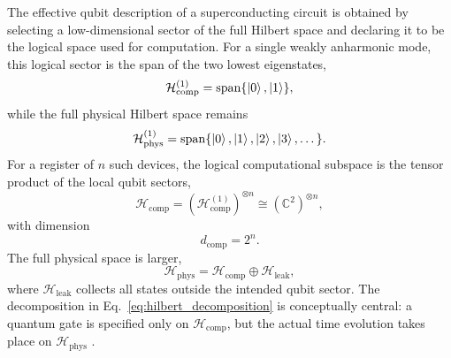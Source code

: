 The effective qubit description of a superconducting circuit is obtained by selecting a low-dimensional sector of the full Hilbert space and declaring it to be the logical space used for computation. For a single weakly anharmonic mode, this logical sector is the span of the two lowest eigenstates,
\begin{equation}
\mathcal{H}_{\mathrm{comp}}^{(1)}
=
\mathrm{span}\{\ket{0},\ket{1}\},
\label{eq:single_qubit_comp_subspace}
\end{equation}
while the full physical Hilbert space remains
\begin{equation}
\mathcal{H}_{\mathrm{phys}}^{(1)}
=
\mathrm{span}\{\ket{0},\ket{1},\ket{2},\ket{3},\dots\}.
\label{eq:single_qubit_phys_subspace}
\end{equation}
For a register of $n$ such devices, the logical computational subspace is the tensor product of the local qubit sectors,
\begin{equation}
\mathcal{H}_{\mathrm{comp}}
=
\left(\mathcal{H}_{\mathrm{comp}}^{(1)}\right)^{\otimes n}
\cong
(\mathbb{C}^{2})^{\otimes n},
\label{eq:nqubit_computational_subspace}
\end{equation}
with dimension
\begin{equation}
d_{\mathrm{comp}} = 2^n.
\label{eq:comp_dimension}
\end{equation}
The full physical space is larger,
\begin{equation}
\mathcal{H}_{\mathrm{phys}}
=
\mathcal{H}_{\mathrm{comp}}
\oplus
\mathcal{H}_{\mathrm{leak}},
\label{eq:hilbert_decomposition}
\end{equation}
where $\mathcal{H}_{\mathrm{leak}}$ collects all states outside the intended qubit sector. The decomposition in Eq.~\eqref{eq:hilbert_decomposition} is conceptually central: a quantum gate is specified only on $\mathcal{H}_{\mathrm{comp}}$, but the actual time evolution takes place on $\mathcal{H}_{\mathrm{phys}}$ \cite{Koch2007,Krantz2019,Niu2019}.

